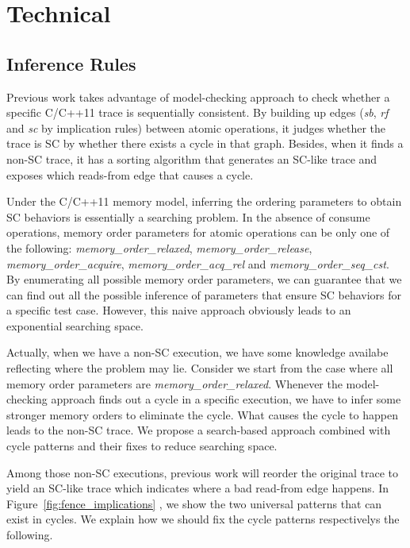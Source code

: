 \section{Technical}\label{sec:technical}

\subsection{Inference Rules}
Previous work takes advantage of model-checking approach to check whether a
specific C/C++11 trace is sequentially consistent. By building up edges
(\textit{sb}, \textit{rf} and \textit{sc} by implication rules) between atomic
operations, it judges whether the trace is SC by whether there exists a cycle in
that graph. Besides, when it finds a non-SC trace, it has a sorting algorithm
that generates an SC-like trace and exposes which reads-from edge that causes a
cycle.

Under the C/C++11 memory model, inferring the ordering parameters to obtain SC
behaviors is essentially a searching problem. In the absence of consume
operations, memory order parameters for atomic operations can be only one of the
following: \textit{memory\_order\_relaxed}, \textit{memory\_order\_release},
\textit{memory\_order\_acquire}, \textit{memory\_order\_acq\_rel} and
\textit{memory\_order\_seq\_cst}. By enumerating all possible memory order
parameters, we can guarantee that we can find out all the possible inference of
parameters that ensure SC behaviors for a specific test case. However, this
naive approach obviously leads to an exponential searching space.

Actually, when we have a non-SC execution, we have some knowledge availabe
reflecting where the problem may lie. Consider we start from the case where all
memory order parameters are \textit{memory\_order\_relaxed}. Whenever the
model-checking approach finds out a cycle in a specific execution, we have to
infer some stronger memory orders to eliminate the cycle. What causes the cycle
to happen leads to the non-SC trace. We propose a search-based approach combined
with cycle patterns and their fixes to reduce searching space.

Among those non-SC executions, previous work will reorder the original trace to
yield an SC-like trace which indicates where a bad read-from edge happens.  In
Figure~\ref{fig:fence_implications} , we show the two universal patterns
that can exist in cycles. We explain how we should fix the cycle patterns
respectivelys the following.


